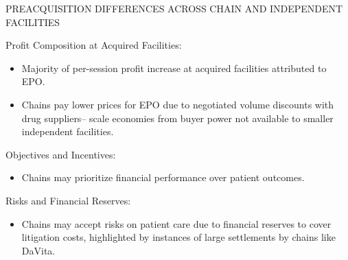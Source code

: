 \begin{frame}{PREACQUISITION DIFFERENCES ACROSS CHAIN AND INDEPENDENT FACILITIES}

Profit Composition at Acquired Facilities:
\begin{itemize}
    \item Majority of per-session profit increase at acquired facilities attributed to EPO.
    \item Chains pay lower prices for EPO due to negotiated volume discounts with drug suppliers-- scale economies from buyer power not available to smaller independent facilities.
\end{itemize}

Objectives and Incentives:
\begin{itemize}
    \item Chains may prioritize financial performance over patient outcomes.
\end{itemize}

Risks and Financial Reserves:
\begin{itemize}
    \item Chains may accept risks on patient care due to financial reserves to cover litigation costs, highlighted by instances of large settlements by chains like DaVita.
\end{itemize}

\end{frame}
